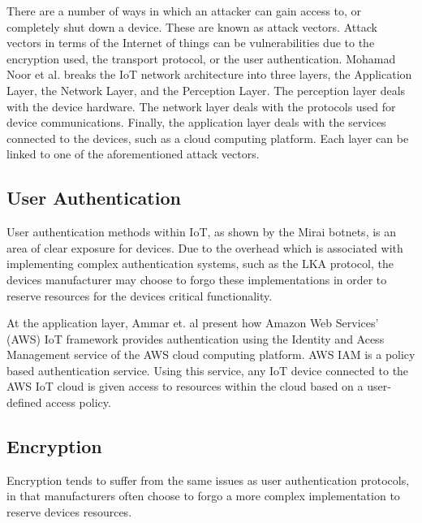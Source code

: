 There are a number of ways in which an attacker can gain access to, or completely
shut down a device. These are known as attack vectors. Attack vectors in terms
of the Internet of things can be vulnerabilities due to the encryption used, the
transport protocol, or the user authentication. Mohamad Noor et al. breaks the
IoT network architecture into three layers, the Application Layer, the Network
Layer, and the Perception Layer\cite{mohamadSec}. The perception layer deals
with the device hardware. The network layer deals with the protocols used for
device communications. Finally, the application layer deals with the services
connected to the devices, such as a cloud computing platform. Each layer can be
linked to one of the aforementioned attack vectors.

\subsection{User Authentication}

User authentication methods within IoT, as shown by the Mirai botnets, is an
area of clear exposure for devices. Due to the overhead which is associated with
implementing complex authentication systems, such as the LKA
protocol\cite{mohamadSec}, the devices manufacturer may choose to forgo these
implementations in order to reserve resources for the devices critical
functionality.

At the application layer, Ammar et. al present how Amazon Web Services' (AWS)
IoT framework provides authentication using the Identity and Acess Management
service of the AWS cloud computing platform\cite{ammarSec}. AWS IAM is a policy
based authentication service. Using this service, any IoT device connected to
the AWS IoT cloud is given access to resources within the cloud based on a
user-defined access policy.

\subsection{Encryption}

Encryption tends to suffer from the same issues as user authentication
protocols, in that manufacturers often choose to forgo a more complex
implementation to reserve devices resources.

